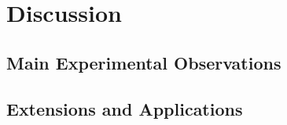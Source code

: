 \section{Discussion}
\subsection{Main Experimental Observations}
\subsection{Extensions and Applications}


